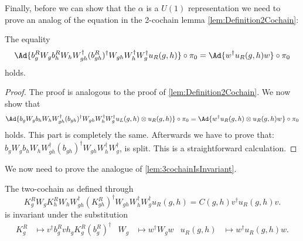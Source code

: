 Finally, before we can show that the $\alpha$ is a $U(1)$ representation we need to prove an analog of the equation in the 2-cochain lemma \ref{lem:Definition2Cochain}:
\begin{lemma}\label{lem:translating_u_R_To_The_Right_identity}
	The equality
	\begin{equation}
		\Ad{b_g^R W_g b_h^R W_h W_{gh}^\dagger (b_{gh}^R)^\dagger W_{gh}W_h^\dagger W_g^\dagger u_R(g,h)}\circ\pi_0=\Ad{w^\dagger u_R(g,h) w}\circ\pi_0
	\end{equation}
	holds.
\end{lemma}
\begin{proof}
	The proof is analogous to the proof of \ref{lem:Definition2Cochain}. We now show that
	\begin{equation}
		\Ad{b_g W_g b_h W_h W_{gh}^\dagger (b_{gh})^\dagger W_{gh}W_h^\dagger W_g^\dagger u_L(g,h)\otimes u_R(g,h)}\circ\pi_0=\Ad{w^\dagger u_R(g,h)\otimes u_R(g,h) w}\circ\pi_0
	\end{equation}
	holds. This part is completely the same. Afterwards we have to prove that: $b_g W_g b_h W_h W_{gh}^\dagger (b_{gh})^\dagger W_{gh}W_h^\dagger W_g^\dagger$, is split. This is a straightforward calculation.
\end{proof}
We now need to prove the analogue of \ref{lem:3cochainIsInvariant}.
\begin{lemma}\label{lem:2cochainIsInvariant}
	The two-cochain as defined through
	\begin{equation}\label{eq:Definition2Cochain2TranslationSectionAppendix}
		K_g^RW_gK_h^RW_hW_{gh}^\dagger(K_{gh}^R)^\dagger W_{gh}W_{h}^\dagger W_g^\dagger u_R(g,h)=C(g,h)v^\dagger u_R(g,h)v.
	\end{equation}
	is invariant under the substitution
	\begin{align}
		K_g^R&\mapsto v^\dagger b_g^R v h_g K_g^R (b_g^R)^\dagger&W_g&\mapsto w^\dagger W_g w&u_R(g,h)&\mapsto w^\dagger u_R(g,h)w.
	\end{align}
\end{lemma}

